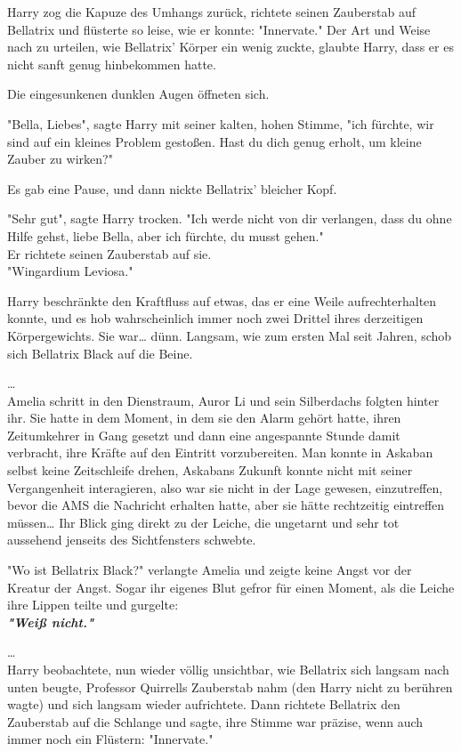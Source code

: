{Harry zog die Kapuze des Umhangs zurück, richtete seinen Zauberstab auf Bellatrix und flüsterte so leise, wie er konnte: "Innervate." Der Art und Weise nach zu urteilen, wie Bellatrix' Körper ein wenig zuckte, glaubte Harry, dass er es nicht sanft genug hinbekommen hatte.

Die eingesunkenen dunklen Augen öffneten sich.

"Bella, Liebes", sagte Harry mit seiner kalten, hohen Stimme, "ich fürchte, wir sind auf ein kleines Problem gestoßen. Hast du dich genug erholt, um kleine Zauber zu wirken?"

Es gab eine Pause, und dann nickte Bellatrix' bleicher Kopf.

"Sehr gut", sagte Harry trocken. "Ich werde nicht von dir verlangen, dass du ohne Hilfe gehst, liebe Bella, aber ich fürchte, du musst gehen."\\ Er richtete seinen Zauberstab auf sie.\\ "Wingardium Leviosa."

Harry beschränkte den Kraftfluss auf etwas, das er eine Weile aufrechterhalten konnte, und es hob wahrscheinlich immer noch zwei Drittel ihres derzeitigen Körpergewichts. Sie war… dünn. Langsam, wie zum ersten Mal seit Jahren, schob sich Bellatrix Black auf die Beine.

…\\ Amelia schritt in den Dienstraum, Auror Li und sein Silberdachs folgten hinter ihr. Sie hatte in dem Moment, in dem sie den Alarm gehört hatte, ihren Zeitumkehrer in Gang gesetzt und dann eine angespannte Stunde damit verbracht, ihre Kräfte auf den Eintritt vorzubereiten. Man konnte in Askaban selbst keine Zeitschleife drehen, Askabans Zukunft konnte nicht mit seiner Vergangenheit interagieren, also war sie nicht in der Lage gewesen, einzutreffen, bevor die AMS die Nachricht erhalten hatte, aber sie hätte rechtzeitig eintreffen müssen… Ihr Blick ging direkt zu der Leiche, die ungetarnt und sehr tot aussehend jenseits des Sichtfensters schwebte.

"Wo ist Bellatrix Black?" verlangte Amelia und zeigte keine Angst vor der Kreatur der Angst. Sogar ihr eigenes Blut gefror für einen Moment, als die Leiche ihre Lippen teilte und gurgelte:\\

\textbf{\emph{"Weiß nicht."}}

…\\ Harry beobachtete, nun wieder völlig unsichtbar, wie Bellatrix sich langsam nach unten beugte, Professor Quirrells Zauberstab nahm (den Harry nicht zu berühren wagte) und sich langsam wieder aufrichtete. Dann richtete Bellatrix den Zauberstab auf die Schlange und sagte, ihre Stimme war präzise, wenn auch immer noch ein Flüstern: "Innervate."

}
